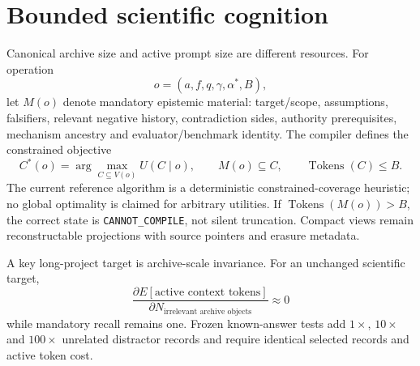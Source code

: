 \documentclass[11pt]{article}
\newcommand{\CannotCompile}{\texttt{CANNOT\_COMPILE}}
\begin{document}
\section{Bounded scientific cognition}
Canonical archive size and active prompt size are different resources. For operation
\begin{equation}o=(a,f,q,\gamma,\alpha^*,B),\end{equation}
let $M(o)$ denote mandatory epistemic material: target/scope, assumptions, falsifiers, relevant negative history, contradiction sides, authority prerequisites, mechanism ancestry and evaluator/benchmark identity. The compiler defines the constrained objective
\begin{equation}C^*(o)=\arg\max_{C\subseteq V(o)}U(C\mid o),\qquad M(o)\subseteq C,\qquad \operatorname{Tokens}(C)\le B.\end{equation}
The current reference algorithm is a deterministic constrained-coverage heuristic; no global optimality is claimed for arbitrary utilities. If $\operatorname{Tokens}(M(o))>B$, the correct state is \CannotCompile{}, not silent truncation. Compact views remain reconstructable projections with source pointers and erasure metadata.

A key long-project target is archive-scale invariance. For an unchanged scientific target,
\begin{equation}\frac{\partial E[\text{active context tokens}]}{\partial N_{\text{irrelevant archive objects}}}\approx0\end{equation}
while mandatory recall remains one. Frozen known-answer tests add $1\times$, $10\times$ and $100\times$ unrelated distractor records and require identical selected records and active token cost.
\end{document}
